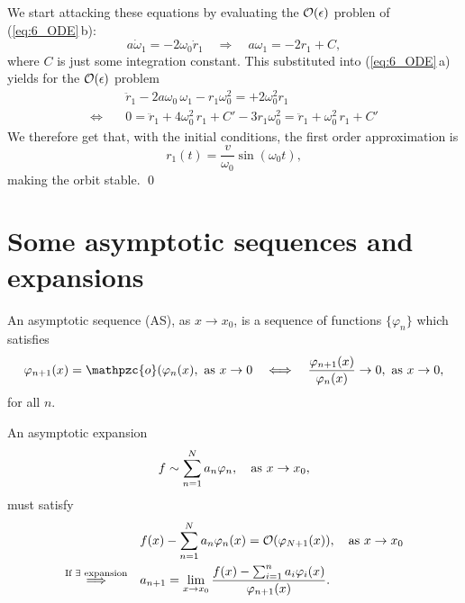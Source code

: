 \documentclass[11pt,letter, swedish, english
]{article}
\newcommand{\oh}{\ensuremath\mathpzc{o}}
\begin{document}
We start attacking these equations by evaluating the
$\order{\epsilon}$ problen of (\ref{eq:6_ODE}\,b):
\begin{equation}
a\dot{\omega}_1=-2\omega_0\dot{r}_1 \quad\Longrightarrow\quad
a\omega_1 = -2r_1 + C,
\end{equation}
where $C$ is just some integration constant. This substituted into 
(\ref{eq:6_ODE}\,a) yields for the $\order{\epsilon}$
problem\footnotemark{} 
\begin{equation}
\begin{aligned}
&\ddot{r}_1 - 2a\omega_0\,\omega_1 - r_1\omega_0^2 = +2\omega_0^2r_1\\
\Longleftrightarrow\quad&
0=\ddot{r}_1 + 4\omega_0^2\,r_1 +C' - 3r_1\omega_0^2 = \ddot{r}_1 +
\omega_0^2\,r_1 +C'
\end{aligned}
\end{equation}
We therefore get that, with the initial conditions, the first order
approximation is
\begin{equation}
r_1(t) = \frac{v}{\omega_0}\sin(\omega_0t),
\end{equation}
making the orbit stable.
\qed
{}


\section{Some asymptotic sequences and expansions}
\newcommand{\as}{\qcomma\text{as }}
An asymptotic sequence (AS), as $x\to x_0$, is a sequence of functions
$\{\varphi_n\}$ which satisfies
\begin{equation}
\varphi_{n+1}(x) = \oh(\varphi_{n}(x), \text{ as } x\to0
\quad\Longleftrightarrow\quad
\frac{\varphi_{n+1}(x)}{\varphi_{n}(x)}\to0 , \text{ as } x\to0,
\end{equation}
for all $n$.

An asymptotic expansion
\begin{equation}
f\sim\sum_{n=1}^N a_n\varphi_n\as x\to x_0,
\end{equation}
must satisfy
\begin{align}
&f(x)-\sum_{n=1}^Na_n\varphi_n(x)=\order{\varphi_{N+1}(x)}\as x\to x_0
\\ \label{eq:7_AE_coef}
\stackrel{\text{If }\exists\text{ expansion}}{\Longrightarrow}\quad
& a_{n+1} = \lim_{x\to x_0} 
\frac{f(x)-\sum_{i=1}^{n}a_i\varphi_i(x)}{\varphi_{n+1}(x)}.
\end{align}
\end{document}
